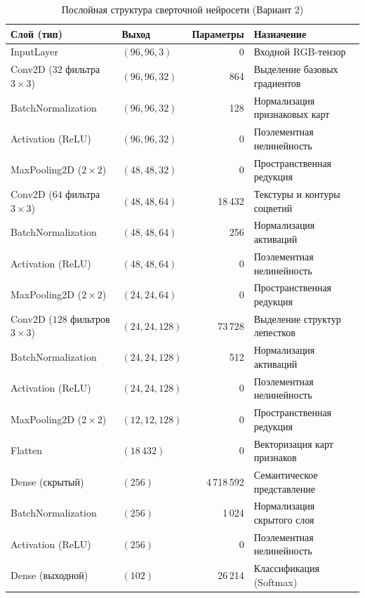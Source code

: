 \begin{table}[H]
\centering
\footnotesize
\caption{Послойная структура сверточной нейросети (Вариант 2)}
\label{tab:model_architecture}
\begin{tabular*}{\textwidth}{@{\extracolsep{\fill}}llrl@{}}
\toprule
\textbf{Слой (тип)} & \textbf{Выход} & \textbf{Параметры} & \textbf{Назначение} \\
\midrule
InputLayer & $(96, 96, 3)$ & 0 & Входной RGB-тензор \\
Conv2D ($32$ фильтра $3\times3$) & $(96, 96, 32)$ & 864 & Выделение базовых градиентов \\
BatchNormalization & $(96, 96, 32)$ & 128 & Нормализация признаковых карт \\
Activation (ReLU) & $(96, 96, 32)$ & 0 & Поэлементная нелинейность \\
MaxPooling2D ($2\times2$) & $(48, 48, 32)$ & 0 & Пространственная редукция \\
\midrule
Conv2D ($64$ фильтра $3\times3$) & $(48, 48, 64)$ & 18\,432 & Текстуры и контуры соцветий \\
BatchNormalization & $(48, 48, 64)$ & 256 & Нормализация активаций \\
Activation (ReLU) & $(48, 48, 64)$ & 0 & Поэлементная нелинейность \\
MaxPooling2D ($2\times2$) & $(24, 24, 64)$ & 0 & Пространственная редукция \\
\midrule
Conv2D ($128$ фильтров $3\times3$) & $(24, 24, 128)$ & 73\,728 & Выделение структур лепестков \\
BatchNormalization & $(24, 24, 128)$ & 512 & Нормализация активаций \\
Activation (ReLU) & $(24, 24, 128)$ & 0 & Поэлементная нелинейность \\
MaxPooling2D ($2\times2$) & $(12, 12, 128)$ & 0 & Пространственная редукция \\
\midrule
Flatten & $(18\,432)$ & 0 & Векторизация карт признаков \\
Dense (скрытый) & $(256)$ & 4\,718\,592 & Семантическое представление \\
BatchNormalization & $(256)$ & 1\,024 & Нормализация скрытого слоя \\
Activation (ReLU) & $(256)$ & 0 & Поэлементная нелинейность \\
Dense (выходной) & $(102)$ & 26\,214 & Классификация (Softmax) \\
\bottomrule
\end{tabular*}
\end{table}

